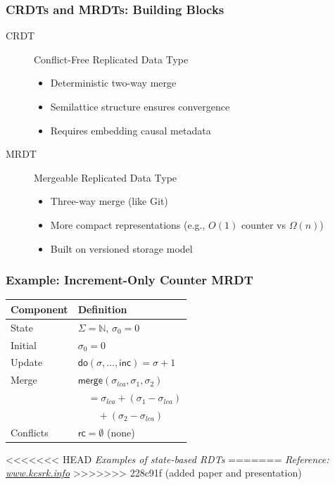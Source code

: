 \documentclass[usepdftitle=false]{beamer}
\newcommand{\F}[1]{\mathsf{#1}}
\begin{document}
\begin{frame}
  \frametitle{CRDTs and MRDTs: Building Blocks}
  \begin{description}
    \item[CRDT] Conflict-Free Replicated Data Type
      \begin{itemize}
        \item Deterministic two-way merge
        \item Semilattice structure ensures convergence
        \item Requires embedding causal metadata
      \end{itemize}
    
    \vspace{0.3cm}
    \item[MRDT] Mergeable Replicated Data Type
      \begin{itemize}
        \item Three-way merge (like Git)
        \item More compact representations (e.g., $O(1)$ counter vs $\Omega(n)$)
        \item Built on versioned storage model
      \end{itemize}
  \end{description}
\end{frame}

\begin{frame}
  \frametitle{Example: Increment-Only Counter MRDT}
  
  \small
  \begin{tabular}{ll}
    \toprule
    \textbf{Component} & \textbf{Definition} \\
    \midrule
    State & $\Sigma = \mathbb{N}$, $\sigma_0 = 0$ \\
    Initial & $\sigma_0 = 0$ \\
    Update & $\F{do}(\sigma, \ldots, \F{inc}) = \sigma + 1$ \\
    Merge & $\F{merge}(\sigma_{lca}, \sigma_1, \sigma_2)$ \\
         & $\quad = \sigma_{lca} + (\sigma_1 - \sigma_{lca})$ \\
         & $\quad \quad + (\sigma_2 - \sigma_{lca})$ \\
    Conflicts & $\F{rc} = \emptyset$ (none) \\
    \bottomrule
  \end{tabular}
  
  \vspace{0.3cm}
<<<<<<< HEAD
  \small\textit{Examples of state-based RDTs}
=======
  \small\textit{Reference: \url{www.kcsrk.info}}
>>>>>>> 228c91f (added paper and presentation)
\end{frame}
\end{document}
